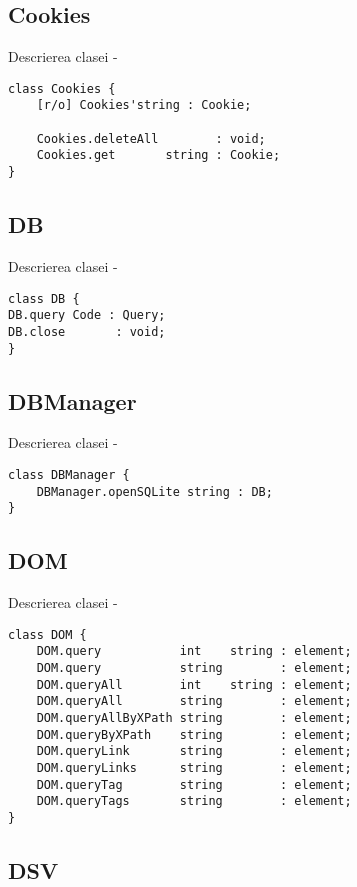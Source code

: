 \subsection{{\color{orange} Cookies}}

\noindent Descrierea clasei  -
\begin{lstlisting}[numbers=none]
class Cookies {
	[r/o] Cookies'string : Cookie;

	Cookies.deleteAll        : void;
	Cookies.get       string : Cookie;
}
\end{lstlisting}

\subsection{{\color{orange} DB}}

\noindent Descrierea clasei  -
\begin{lstlisting}[numbers=none]
class DB {
DB.query Code : Query;
DB.close       : void;
}
\end{lstlisting}

\subsection{{\color{orange} DBManager}}

\noindent Descrierea clasei  -
\begin{lstlisting}[numbers=none]
class DBManager {
	DBManager.openSQLite string : DB;
}
\end{lstlisting}

\subsection{{\color{orange} DOM}}

\noindent Descrierea clasei  -
\begin{lstlisting}[numbers=none]
class DOM {
	DOM.query           int    string : element;
	DOM.query           string        : element;
	DOM.queryAll        int    string : element;
	DOM.queryAll        string        : element;
	DOM.queryAllByXPath string        : element;
	DOM.queryByXPath    string        : element;
	DOM.queryLink       string        : element;
	DOM.queryLinks      string        : element;
	DOM.queryTag        string        : element;
	DOM.queryTags       string        : element;
}
\end{lstlisting}

\subsection{{\color{orange} DSV}}

